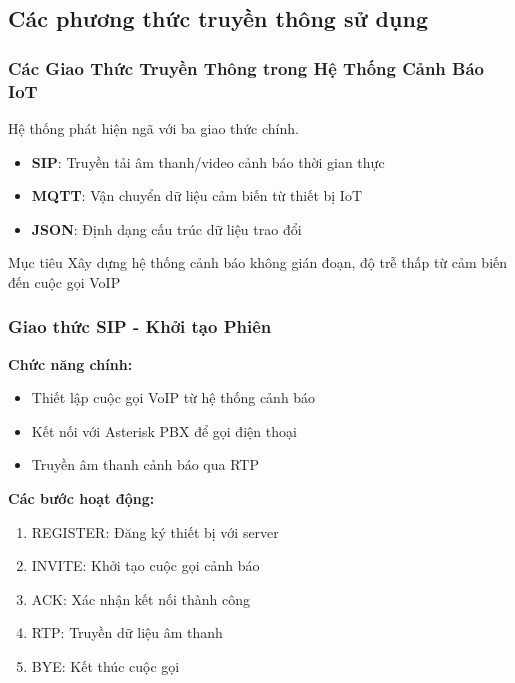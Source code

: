 \subsection{Các phương thức truyền thông sử dụng}

\begin{frame}
\frametitle{Các Giao Thức Truyền Thông trong Hệ Thống Cảnh Báo IoT}
\begin{center}
\Large Hệ thống phát hiện ngã với ba giao thức chính.
\end{center}

\begin{itemize}
\item \textbf{SIP}: Truyền tải âm thanh/video cảnh báo thời gian thực
\item \textbf{MQTT}: Vận chuyển dữ liệu cảm biến từ thiết bị IoT
\item \textbf{JSON}: Định dạng cấu trúc dữ liệu trao đổi
\end{itemize}

\begin{block}{Mục tiêu}
Xây dựng hệ thống cảnh báo không gián đoạn, độ trễ thấp từ cảm biến đến cuộc gọi VoIP
\end{block}
\end{frame}

\begin{frame}
\frametitle{Giao thức SIP - Khởi tạo Phiên}
\textbf{Chức năng chính:}
\begin{itemize}
\item Thiết lập cuộc gọi VoIP từ hệ thống cảnh báo
\item Kết nối với Asterisk PBX để gọi điện thoại
\item Truyền âm thanh cảnh báo qua RTP
\end{itemize}

\textbf{Các bước hoạt động:}
\begin{enumerate}
\item REGISTER: Đăng ký thiết bị với server
\item INVITE: Khởi tạo cuộc gọi cảnh báo
\item ACK: Xác nhận kết nối thành công
\item RTP: Truyền dữ liệu âm thanh
\item BYE: Kết thúc cuộc gọi
\end{enumerate}
\end{frame}


